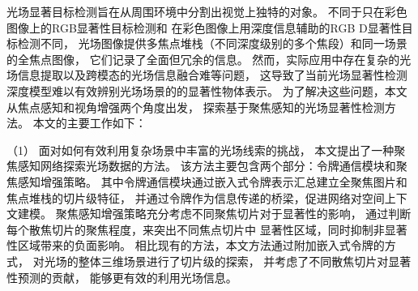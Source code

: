 





%
%
%
%
%
%
%






光场显著目标检测旨在从周围环境中分割出视觉上独特的对象。
不同于只在彩色图像上的RGB显著性目标检测和
在彩色图像上用深度信息辅助的RGB D显著性目标检测不同，
光场图像提供多焦点堆栈（不同深度级别的多个焦段）和同一场景的全焦点图像，
它们记录了全面但冗余的信息。
然而，实际应用中存在复杂的光场信息提取以及跨模态的光场信息融合难等问题，
这导致了当前光场显著性检测深度模型难以有效辨别光场场景的的显著性物体表示。
为了解决这些问题，本文从焦点感知和视角增强两个角度出发，
探索基于聚焦感知的光场显著性检测方法。
本文的主要工作如下：




%
%
（1）
%
%
面对如何有效利用复杂场景中丰富的光场线索的挑战，
本文提出了一种聚焦感知网络探索光场数据的方法。
该方法主要包含两个部分：令牌通信模块和聚焦感知增强策略。
其中令牌通信模块通过嵌入式令牌表示汇总建立全聚焦图片和焦点堆栈的切片级特征，
并通过令牌作为信息传递的桥梁，促进网络对空间上下文建模。
聚焦感知增强策略充分考虑不同聚焦切片对于显著性的影响，
通过判断每个散焦切片的聚焦程度，来突出不同焦点切片中
显著性区域，同时抑制非显著性区域带来的负面影响。
相比现有的方法，本文方法通过附加嵌入式令牌的方式，
对光场的整体三维场景进行了切片级的探索，
并考虑了不同散焦切片对显著性预测的贡献，
能够更有效的利用光场信息。

